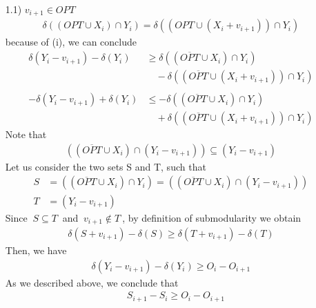 \documentclass[a4paper,11pt]{article}
\begin{document}
\begin{itemize}
	\item[1.1)] $ v_{i+1} \in OPT$
	\begin{align*}
	\delta((OPT \cup X_i) \cap Y_i) = \delta((OPT \cup (X_{i} + v_{i+1})) \cap Y_{i}) 
	\end{align*} 
	because of (i), we can conclude
	\begin{align*}
	\delta(Y_{i} - v_{i+1})  - \delta(Y_{i}) &\geq  \delta((\overline{OPT} \cup X_i) \cap Y_i)\\ &\quad - \delta((\overline{OPT} \cup (X_{i} + v_{i+1})) \cap Y_{i})\\\\
	-\delta(Y_{i} - v_{i+1})  + \delta(Y_{i})  &\leq  - \delta((\overline{OPT} \cup X_i) \cap Y_i)\\ &\quad + \delta((\overline{OPT} \cup (X_{i} + v_{i+1})) \cap Y_{i})
	\end{align*} 
	Note that
	\begin{align*}
	((\overline{OPT} \cup X_i) \cap (Y_i - v_{i+1})) \subseteq (Y_i - v_{i+1})
	\end{align*} 
	Let us consider the two sets S and T, such that
	\begin{align*}
	S &= ((\overline{OPT} \cup X_i) \cap Y_i) = ((\overline{OPT} \cup X_i) \cap (Y_i - v_{i+1}))\\
	T &= (Y_i - v_{i+1})
	\end{align*} 
	Since $\ S \subseteq T \ $ and $\ v_{i+1} \not \in T \ $, by definition of submodularity we obtain 
	\begin{align*}
	\delta(S + v_{i+1}) - \delta(S)  \geq  \delta(T + v_{i+1}) - \delta(T)
	\end{align*}  
	Then, we have
	\begin{align*}
	\delta(Y_{i} - v_{i+1})  - \delta(Y_{i})  \geq  O_i - O_{i+1}
	\end{align*}
	As we described above, we conclude that
	\begin{align*}
	\quad S_{i+1} - S_i  \geq O_i - O_{i+1}
	\end{align*}
	

\end{itemize}
\end{document}
